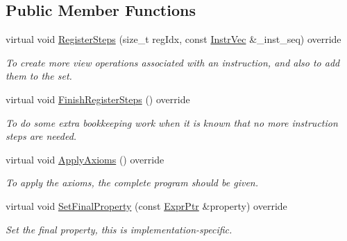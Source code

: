 \subsection*{Public Member Functions}
\begin{DoxyCompactItemize}
\item 
\mbox{\label{classilang_1_1_sc_ac3f3a91b32deeed529625a7e5ad9fef6}} 
virtual void \mbox{\hyperlink{classilang_1_1_sc_ac3f3a91b32deeed529625a7e5ad9fef6}{Register\+Steps}} (size\+\_\+t reg\+Idx, const \mbox{\hyperlink{classilang_1_1_memory_model_ac6cb2d9253fb53a10ea66fd1e71267bc}{Instr\+Vec}} \&\+\_\+inst\+\_\+seq) override
\begin{DoxyCompactList}\small\item\em To create more view operations associated with an instruction, and also to add them to the set. \end{DoxyCompactList}\item 
\mbox{\label{classilang_1_1_sc_af778a694603c1383718b04c00e8369f4}} 
virtual void \mbox{\hyperlink{classilang_1_1_sc_af778a694603c1383718b04c00e8369f4}{Finish\+Register\+Steps}} () override
\begin{DoxyCompactList}\small\item\em To do some extra bookkeeping work when it is known that no more instruction steps are needed. \end{DoxyCompactList}\item 
\mbox{\label{classilang_1_1_sc_a6c4a9d771ef4c32d088e7c6f3acb47e1}} 
virtual void \mbox{\hyperlink{classilang_1_1_sc_a6c4a9d771ef4c32d088e7c6f3acb47e1}{Apply\+Axioms}} () override
\begin{DoxyCompactList}\small\item\em To apply the axioms, the complete program should be given. \end{DoxyCompactList}\item 
\mbox{\label{classilang_1_1_sc_ab807217c8c80b16179c5308a9df8cd7c}} 
virtual void \mbox{\hyperlink{classilang_1_1_sc_ab807217c8c80b16179c5308a9df8cd7c}{Set\+Final\+Property}} (const \mbox{\hyperlink{namespaceilang_a7c4196c72e53ea4df4b7861af7bc3bce}{Expr\+Ptr}} \&property) override
\begin{DoxyCompactList}\small\item\em Set the final property, this is implementation-\/specific. \end{DoxyCompactList}\item 

\end{DoxyCompactItemize}
